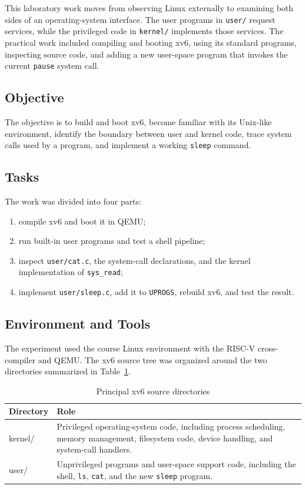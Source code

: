 \documentclass[12pt]{article}
\newcommand{\commandname}[1]{\texttt{#1}}
\begin{document}
This laboratory work moves from observing Linux externally to examining both sides of an operating-system interface. The user programs in \commandname{user/} request services, while the privileged code in \commandname{kernel/} implements those services. The practical work included compiling and booting xv6, using its standard programs, inspecting source code, and adding a new user-space program that invokes the current \commandname{pause} system call.

\subsection{Objective}

The objective is to build and boot xv6, become familiar with its Unix-like environment, identify the boundary between user and kernel code, trace system calls used by a program, and implement a working \commandname{sleep} command.

\subsection{Tasks}

The work was divided into four parts:

\begin{enumerate}
    \item compile xv6 and boot it in QEMU;
    \item run built-in user programs and test a shell pipeline;
    \item inspect \commandname{user/cat.c}, the system-call declarations, and the kernel implementation of \commandname{sys\_read};
    \item implement \commandname{user/sleep.c}, add it to \commandname{UPROGS}, rebuild xv6, and test the result.
\end{enumerate}

\subsection{Environment and Tools}

The experiment used the course Linux environment with the RISC-V cross-compiler and QEMU. The xv6 source tree was organized around the two directories summarized in Table~\ref{tab:tree}.

\begin{table}[H]
    \centering
    \caption{Principal xv6 source directories}
    \label{tab:tree}
    \begin{tabular}{>{\ttfamily}p{} p{}}
        \toprule
        \normalfont\textbf{Directory} & \textbf{Role} \\
        \midrule
        kernel/ & Privileged operating-system code, including process scheduling, memory management, filesystem code, device handling, and system-call handlers. \\
        user/ & Unprivileged programs and user-space support code, including the shell, \commandname{ls}, \commandname{cat}, and the new \commandname{sleep} program. \\
        \bottomrule
    \end{tabular}
\end{table}
\end{document}
